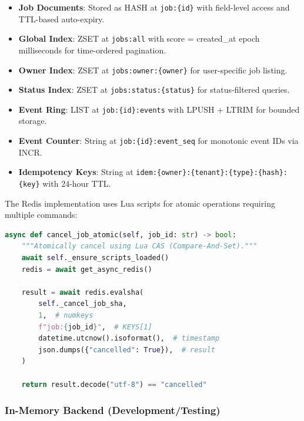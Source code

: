 \begin{itemize}
    \item \textbf{Job Documents}: Stored as HASH at \texttt{job:\{id\}} with field-level access and TTL-based auto-expiry.
    
    \item \textbf{Global Index}: ZSET at \texttt{jobs:all} with score = created\_at epoch milliseconds for time-ordered pagination.
    
    \item \textbf{Owner Index}: ZSET at \texttt{jobs:owner:\{owner\}} for user-specific job listing.
    
    \item \textbf{Status Index}: ZSET at \texttt{jobs:status:\{status\}} for status-filtered queries.
    
    \item \textbf{Event Ring}: LIST at \texttt{job:\{id\}:events} with LPUSH + LTRIM for bounded storage.
    
    \item \textbf{Event Counter}: String at \texttt{job:\{id\}:event\_seq} for monotonic event IDs via INCR.
    
    \item \textbf{Idempotency Keys}: String at \texttt{idem:\{owner\}:\{tenant\}:\{type\}:\{hash\}:\{key\}} with 24-hour TTL.
\end{itemize}

The Redis implementation uses Lua scripts for atomic operations requiring multiple commands:

\begin{lstlisting}[language=Python, caption={Atomic job cancellation using Lua script.}]
async def cancel_job_atomic(self, job_id: str) -> bool:
    """Atomically cancel using Lua CAS (Compare-And-Set)."""
    await self._ensure_scripts_loaded()
    redis = await get_async_redis()
    
    result = await redis.evalsha(
        self._cancel_job_sha,
        1,  # numkeys
        f"job:{job_id}",  # KEYS[1]
        datetime.utcnow().isoformat(),  # timestamp
        json.dumps({"cancelled": True}),  # result
    )
    
    return result.decode("utf-8") == "cancelled"
\end{lstlisting}

\subsubsection{In-Memory Backend (Development/Testing)}

